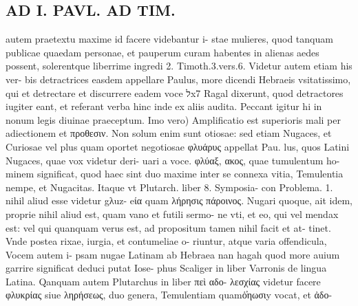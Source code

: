 \documentclass{article}
\begin{document}
\begin{pages}
\section*{AD I. PAVL. AD TIM. }
\marginpar{[ p.286 ]}\pstart autem praetextu maxime id facere videbantur i- stae mulieres, quod tanquam publicae quaedam personae, et pauperum curam habentes in alienas aedes possent, solerentque liberrime ingredi 2. Timoth.3.vers.6. Videtur autem etiam his ver- bis detractrices easdem appellare Paulus, more dicendi Hebraeis vsitatissimo, qui et detrectare et discurrere eadem voce לx7 Ragal dixerunt, quod detractores iugiter eant, et referant verba hinc inde ex aliis audita. Peccant igitur hi in nonum legis diuinae praeceptum.  \pend\pstart Imo vero) Amplificatio est superioris mali per adiectionem et προθεσιν. Non solum enim sunt otiosae: sed etiam Nugaces, et Curiosae vel plus quam oportet negotiosae φλυάρυς appellat Pau. lus, quos Latini Nugaces, quae vox videtur deri- uari a voce. φλύαξ, ακος, quae tumulentum ho- minem significat, quod haec sint duo maxime inter se connexa vitia, Temulentia nempe, et Nugacitas. Itaque vt Plutarch. liber 8. Symposia- con Problema. 1. nihil aliud esse videtur gλuz- eία quam λήρησις πάροινος. Nugari quoque, ait idem, proprie nihil aliud est, quam vano et futili sermo- ne vti, et eo, qui vel mendax est: vel qui quanquam verus est, ad propositum tamen nihil facit et at- tinet. Vnde postea rixae, iurgia, et contumeliae o- riuntur, atque varia offendicula, Vocem autem i- psam nugae Latinam ab Hebraea nan hagah quod more auium garrire significat deduci putat Iose- phus Scaliger in liber  Varronis de lingua Latina. Qanquam autem Plutarchus in liber  πεὶ αδο- λεσχίας videtur facere φλυκρίας siue ληρήσεως, duo  \pend\pstart genera, Temulentiam quamὁ̓ηωσιy vocat, et ἀδο-  \pend

\end{pages}
\end{document}
